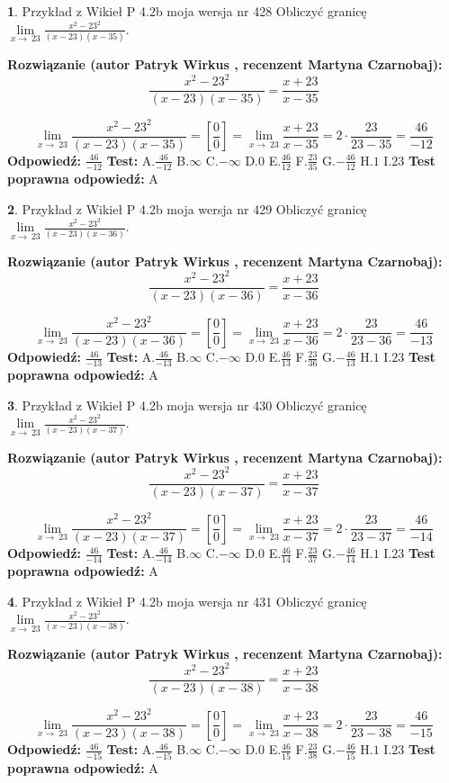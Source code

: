 \documentclass[12pt, a4paper]{article}
\theoremstyle{definition} %
\newtheorem{zad}{}
\newcommand{\zadStart}[1]{\begin{zad}#1\newline}
\newcommand{\zadStop}{\end{zad}}
\newcommand{\rozwStart}[2]{\noindent \textbf{Rozwiązanie (autor #1 , recenzent #2): }\newline}
\newcommand{\rozwStop}{\newline}
\newcommand{\odpStart}{\noindent \textbf{Odpowiedź:}\newline}
\newcommand{\odpStop}{\newline}
\newcommand{\testStart}{\noindent \textbf{Test:}\newline}
\newcommand{\testStop}{\newline}
\newcommand{\kluczStart}{\noindent \textbf{Test poprawna odpowiedź:}\newline}
\newcommand{\kluczStop}{\newline}
\begin{document}
\zadStart{Przykład z Wikieł P 4.2b moja wersja nr 428}
Obliczyć granicę $\lim\limits_{x\to\ 23}\frac{x^{2}-23^{2}}{(x-23)(x-35)}$.
\zadStop
\rozwStart{Patryk Wirkus}{Martyna Czarnobaj}
$$\frac{x^{2}-23^{2}}{(x-23)(x-35)}=\frac{x+23}{x-35}$$

$$\lim\limits_{x\to\ 23}\frac{x^{2}-23^{2}}{(x-23)(x-35)}=[\frac{0}{0}]=\lim\limits_{x\to\ 23}\frac{x+23}{x-35}=2 \cdot \frac{23}{23-35} = \frac{46}{-12}$$
\rozwStop
\odpStart
$\frac{46}{-12}$
\odpStop
\testStart
A.$\frac{46}{-12}$
B.$\infty$
C.$-\infty$
D.$0$
E.$\frac{46}{12}$
F.$\frac{23}{35}$
G.$-\frac{46}{12}$
H.$1$
I.$23$
\testStop
\kluczStart
A
\kluczStop



\zadStart{Przykład z Wikieł P 4.2b moja wersja nr 429}
Obliczyć granicę $\lim\limits_{x\to\ 23}\frac{x^{2}-23^{2}}{(x-23)(x-36)}$.
\zadStop
\rozwStart{Patryk Wirkus}{Martyna Czarnobaj}
$$\frac{x^{2}-23^{2}}{(x-23)(x-36)}=\frac{x+23}{x-36}$$

$$\lim\limits_{x\to\ 23}\frac{x^{2}-23^{2}}{(x-23)(x-36)}=[\frac{0}{0}]=\lim\limits_{x\to\ 23}\frac{x+23}{x-36}=2 \cdot \frac{23}{23-36} = \frac{46}{-13}$$
\rozwStop
\odpStart
$\frac{46}{-13}$
\odpStop
\testStart
A.$\frac{46}{-13}$
B.$\infty$
C.$-\infty$
D.$0$
E.$\frac{46}{13}$
F.$\frac{23}{36}$
G.$-\frac{46}{13}$
H.$1$
I.$23$
\testStop
\kluczStart
A
\kluczStop



\zadStart{Przykład z Wikieł P 4.2b moja wersja nr 430}
Obliczyć granicę $\lim\limits_{x\to\ 23}\frac{x^{2}-23^{2}}{(x-23)(x-37)}$.
\zadStop
\rozwStart{Patryk Wirkus}{Martyna Czarnobaj}
$$\frac{x^{2}-23^{2}}{(x-23)(x-37)}=\frac{x+23}{x-37}$$

$$\lim\limits_{x\to\ 23}\frac{x^{2}-23^{2}}{(x-23)(x-37)}=[\frac{0}{0}]=\lim\limits_{x\to\ 23}\frac{x+23}{x-37}=2 \cdot \frac{23}{23-37} = \frac{46}{-14}$$
\rozwStop
\odpStart
$\frac{46}{-14}$
\odpStop
\testStart
A.$\frac{46}{-14}$
B.$\infty$
C.$-\infty$
D.$0$
E.$\frac{46}{14}$
F.$\frac{23}{37}$
G.$-\frac{46}{14}$
H.$1$
I.$23$
\testStop
\kluczStart
A
\kluczStop



\zadStart{Przykład z Wikieł P 4.2b moja wersja nr 431}
Obliczyć granicę $\lim\limits_{x\to\ 23}\frac{x^{2}-23^{2}}{(x-23)(x-38)}$.
\zadStop
\rozwStart{Patryk Wirkus}{Martyna Czarnobaj}
$$\frac{x^{2}-23^{2}}{(x-23)(x-38)}=\frac{x+23}{x-38}$$

$$\lim\limits_{x\to\ 23}\frac{x^{2}-23^{2}}{(x-23)(x-38)}=[\frac{0}{0}]=\lim\limits_{x\to\ 23}\frac{x+23}{x-38}=2 \cdot \frac{23}{23-38} = \frac{46}{-15}$$
\rozwStop
\odpStart
$\frac{46}{-15}$
\odpStop
\testStart
A.$\frac{46}{-15}$
B.$\infty$
C.$-\infty$
D.$0$
E.$\frac{46}{15}$
F.$\frac{23}{38}$
G.$-\frac{46}{15}$
H.$1$
I.$23$
\testStop
\kluczStart
A
\kluczStop
\end{document}
